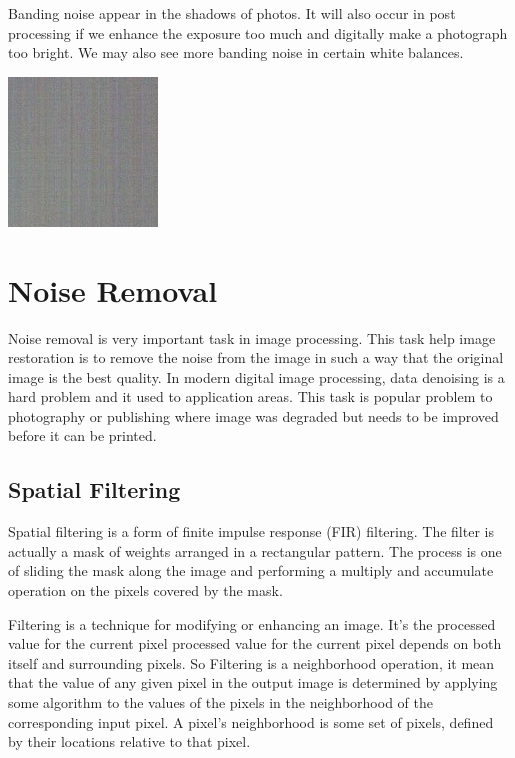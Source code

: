 \documentclass[10pt]{article}
\begin{document}
Banding noise appear in the shadows of photos. It will also occur in post processing if we enhance the exposure too much and digitally make a photograph too bright. We may also see more banding noise in certain white balances.

\begin{center}
	\includegraphics{banding.png}
\end{center}


\section{Noise Removal}

Noise removal is very important task in image processing. This task help image restoration is to remove the noise from the image in such a way that the original image is the best quality. In modern digital image processing, data denoising is a hard problem and it used to application areas. This task is popular problem to  photography or publishing where image was degraded but needs to be improved before it can be printed.


\subsection{Spatial Filtering}
Spatial filtering is a form of finite impulse response (FIR) filtering. The filter is actually a mask of weights arranged in a rectangular pattern. The process is one of sliding the mask along the image and performing a multiply and accumulate operation on the pixels covered by the mask.


Filtering is a technique for modifying or enhancing an image. It's the processed value for the current pixel processed value for the current pixel depends on both itself and surrounding pixels. So Filtering is a neighborhood operation, it mean that the value of any given pixel in the output image is determined by applying some algorithm to the values of the pixels in the neighborhood of the corresponding input pixel. A pixel's neighborhood is some set of pixels, defined by their locations relative to that pixel. 
\end{document}

